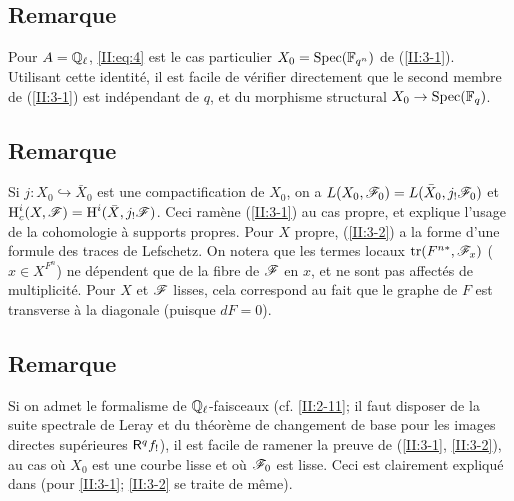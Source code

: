 \documentclass[oneside]{book}
\begin{document}
\subsection{Remarque}\label{II:3-5}

Pour $A=\mathbb{Q}_\ell$, \eqref{II:eq:4} est le cas particulier 
$X_0=\operatorname{Spec}(\mathbb{F}_{q^n})$ de (\ref{II:3-1}). Utilisant cette identité, il est 
facile de vérifier directement que le second membre de (\ref{II:3-1}) est 
indépendant de $q$, et du morphisme structural $X_0\to\operatorname{Spec}(\mathbb{F}_q)$. 





\subsection{Remarque}\label{II:3-6}

Si $j:X_0\hookrightarrow \bar X_0$ est une compactification de $X_0$, on a 
$L(X_0,\mathscr{F}_0) = L(\bar X_0, j_!\mathscr{F}_0)$ et 
$\operatorname{H}_c^i(X,\mathscr{F}) = \operatorname{H}^i(\bar X,j_!\mathscr{F})$. Ceci ramène (\ref{II:3-1}) au cas 
propre, et explique l'usage de la cohomologie à supports propres. Pour $X$ 
propre, (\ref{II:3-2}) a la forme d'une formule des traces de Lefschetz. On 
notera que les termes locaux $\operatorname{tr}(F^{n *},\mathscr{F}_x)$ ($x\in X^{F^n}$) ne 
dépendent que de la fibre de $\mathscr{F}$ en $x$, et ne sont pas affectés de 
multiplicité. Pour $X$ et $\mathscr{F}$ lisses, cela correspond au fait que le graphe 
de $F$ est transverse à la diagonale (puisque $d F = 0$). 





\subsection{Remarque}\label{II:3-7}

Si on admet le formalisme de $\mathbb{Q}_\ell$-faisceaux (cf. \ref{II:2-11}; il faut 
disposer de la suite spectrale de Leray et du théorème de changement de 
base pour les images directes supérieures $\mathsf{R}^q f_!$), il est facile de 
ramener la preuve de (\ref{II:3-1}, \ref{II:3-2}), au cas où $X_0$ est 
une courbe lisse et où $\mathscr{F}_0$ est lisse. Ceci est clairement expliqué 
dans \cite[\S 5]{II:2} (pour \ref{II:3-1}; \ref{II:3-2} se traite de même). 





\subsection{}\label{II:3-8}
\end{document}
